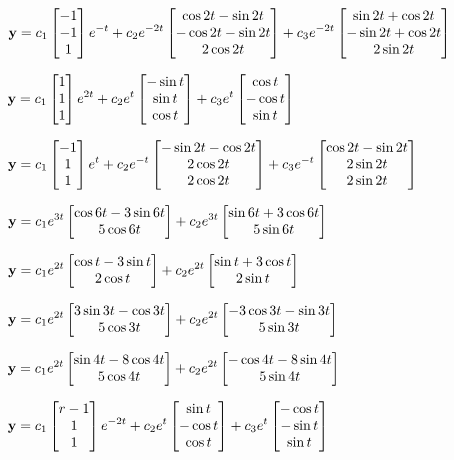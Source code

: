 \smallskip
{}
 $\displaystyle{\mathbf{y}=c_1\begin{bmatrix}-1\\-1\\1\end{bmatrix}e^{-t}+c_2e^{-2t}\begin{bmatrix}\cos2t-\sin
2t\\-\cos2t-\sin  2t\\2\cos2t\end{bmatrix}+c_3e^{-2t}\begin{bmatrix}\sin2t+\cos2t\\-\sin2t+\cos2t\\2\sin2t\end{bmatrix}}$

\smallskip
{}
 $\displaystyle{\mathbf{y}=c_1\begin{bmatrix}1\\1\\1\end{bmatrix}e^{2t}+c_2e^t\begin{bmatrix}-\sin
t\\\sin  t\\\cos t\end{bmatrix}+c_3e^t\begin{bmatrix}\cos t\\-\cos t\\\sin t\end{bmatrix}}$

\smallskip
{}
 $\displaystyle{\mathbf{y}=c_1\begin{bmatrix}-1\\1\\1\end{bmatrix}e^t+c_2e^{-t}\begin{bmatrix}-\sin
2t-\cos2t\\2\cos2t\\2\cos2t\end{bmatrix}+c_3e^{-t}\begin{bmatrix}\cos2t-\sin2t\\2\sin2t\\2\sin2t\end{bmatrix}}$

\smallskip
{}
$\displaystyle{\mathbf{y}=c_1e^{3t}\begin{bmatrix}\cos6t-3\sin6t\\
5\cos6t\end{bmatrix}+
c_2e^{3t}\begin{bmatrix}
\sin6t+3\cos6t\\5\sin6t\end{bmatrix}}$

\smallskip
{}
$\displaystyle{\mathbf{y}=c_1e^{2t}\begin{bmatrix}\cos t-3\sin t\\
2\cos t\end{bmatrix}+
c_2e^{2t}\begin{bmatrix}\sin t+3\cos t\\ 2\sin t\end{bmatrix}}$

\smallskip
{}
$\displaystyle{\mathbf{y}=c_1e^{2t}\begin{bmatrix}3\sin3t-\cos3t\\5\cos3t\end{bmatrix}
+c_2e^{2t}\begin{bmatrix}-3\cos3t-\sin3t\\  5\sin3t\end{bmatrix}}$

\smallskip
{}
$\displaystyle{\mathbf{y}=c_1e^{2t}\begin{bmatrix}\sin4t-8\cos4t\\
5\cos4t\end{bmatrix}+
c_2e^{2t}\begin{bmatrix}-\cos4t-8\sin4t\\ 5\sin4t\end{bmatrix}}$

\smallskip
{}
$\displaystyle{\mathbf{y}=c_1\begin{bmatrix}{r}-1\\1\\1\end{bmatrix}e^{-2t}
+c_2e^t\begin{bmatrix}\sin t\\-\cos t\\\cos t\end{bmatrix}
+c_3e^t\begin{bmatrix}-\cos t\\-\sin t\\\sin t\end{bmatrix}}$

